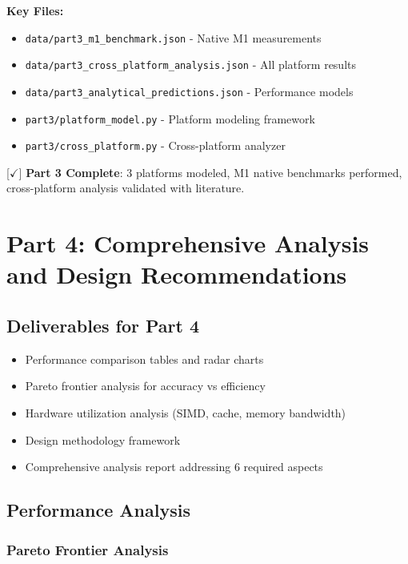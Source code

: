 \documentclass[10pt, a4paper]{article}
\begin{document}
\textbf{Key Files:}
\begin{itemize}
    \item \texttt{data/part3\_m1\_benchmark.json} - Native M1 measurements
    \item \texttt{data/part3\_cross\_platform\_analysis.json} - All platform results
    \item \texttt{data/part3\_analytical\_predictions.json} - Performance models
    \item \texttt{part3/platform\_model.py} - Platform modeling framework
    \item \texttt{part3/cross\_platform.py} - Cross-platform analyzer
\end{itemize}

[$\checkmark$] \textbf{Part 3 Complete}: 3 platforms modeled, M1 native benchmarks performed, cross-platform analysis validated with literature.

\section*{Part 4: Comprehensive Analysis and Design Recommendations}

\subsection{Deliverables for Part 4}

\begin{itemize}
    \item Performance comparison tables and radar charts
    \item Pareto frontier analysis for accuracy vs efficiency
    \item Hardware utilization analysis (SIMD, cache, memory bandwidth)
    \item Design methodology framework
    \item Comprehensive analysis report addressing 6 required aspects
\end{itemize}

\subsection{Performance Analysis}

\subsubsection{Pareto Frontier Analysis}
\end{document}

